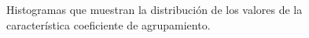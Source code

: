 \documentclass{article}
\begin{document}
\begin{figure}[htbp]

\caption{Histogramas que muestran la distribución de los valores de la característica coeficiente de agrupamiento. }
\label{fig8}
 
\end{figure}
\end{document}
